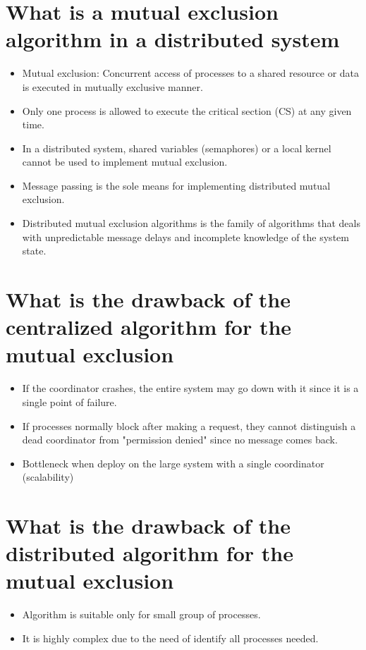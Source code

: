 \documentclass[11pt,a4paper]{report}
\begin{document}
\section{What is a mutual exclusion algorithm in a distributed system}
\begin{itemize}
	\item Mutual exclusion: Concurrent access of processes to a shared resource or data is executed in mutually exclusive manner.
	\item Only one process is allowed to execute the critical section (CS) at any given time.
	\item In a distributed system, shared variables (semaphores) or a local kernel cannot be used to implement mutual exclusion.
	\item Message passing is the sole means for implementing distributed mutual exclusion.
	\item Distributed mutual exclusion algorithms is the family of algorithms that deals with unpredictable message delays and incomplete knowledge of the system state.
\end{itemize}

\section{What is the drawback of the centralized algorithm for the mutual exclusion}
\begin{itemize}
	\item If the coordinator crashes, the entire system may go down with it since it is a single point of failure.
	\item If processes normally block after making a request, they cannot distinguish a dead coordinator from "permission denied" since no message comes back.
	\item Bottleneck when deploy on the large system with a single coordinator (scalability)
\end{itemize}

\section{What is the drawback of the distributed algorithm for the mutual exclusion}
\begin{itemize}
	\item Algorithm is suitable only for small group of processes.
	\item It is highly complex due to the need of identify all processes needed.
\end{itemize}
\end{document}
